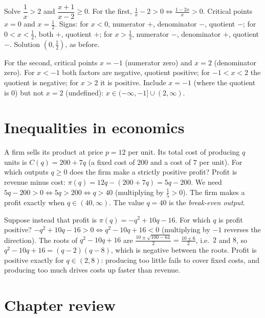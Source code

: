 \begin{example}
Solve $\dfrac1x>2$ and $\dfrac{x+1}{x-2}\ge0$.
\solution
For the first, $\frac1x-2>0\Leftrightarrow\frac{1-2x}{x}>0$. Critical points $x=0$ and $x=\tfrac12$. Signs:
for $x<0$, numerator $+$, denominator $-$, quotient $-$; for $0<x<\tfrac12$, both $+$, quotient $+$; for
$x>\tfrac12$, numerator $-$, denominator $+$, quotient $-$. Solution $(0,\tfrac12)$, as before.

For the second, critical points $x=-1$ (numerator zero) and $x=2$ (denominator zero). For $x<-1$ both factors
are negative, quotient positive; for $-1<x<2$ the quotient is negative; for $x>2$ it is positive. Include $x=-1$
(where the quotient is $0$) but not $x=2$ (undefined): $x\in(-\infty,-1]\cup(2,\infty)$.
\end{example}

\section{Inequalities in economics}\label{sec:ineq-econ}

\begin{example}
A firm sells its product at price $p=12$ per unit. Its total cost of producing $q$ units is $C(q)=200+7q$
(a fixed cost of $200$ and a cost of $7$ per unit). For which outputs $q\ge0$ does the firm make a strictly
positive profit?
\solution
Profit is revenue minus cost: $\pi(q)=12q-(200+7q)=5q-200$. We need $5q-200>0\Leftrightarrow 5q>200\Leftrightarrow q>40$
(multiplying by $\tfrac15>0$). The firm makes a profit exactly when $q\in(40,\infty)$. The value $q=40$ is the
\emph{break-even output}.
\end{example}

\begin{example}
Suppose instead that profit is $\pi(q)=-q^2+10q-16$. For which $q$ is profit positive?
\solution
$-q^2+10q-16>0\Leftrightarrow q^2-10q+16<0$ (multiplying by $-1$ reverses the direction). The roots of
$q^2-10q+16$ are $\frac{10\pm\sqrt{100-64}}2=\frac{10\pm6}2$, i.e.\ $2$ and $8$, so $q^2-10q+16=(q-2)(q-8)$, which is
negative between the roots. Profit is positive exactly for $q\in(2,8)$: producing too little fails to cover
fixed costs, and producing too much drives costs up faster than revenue.
\end{example}

\section{Chapter review}
